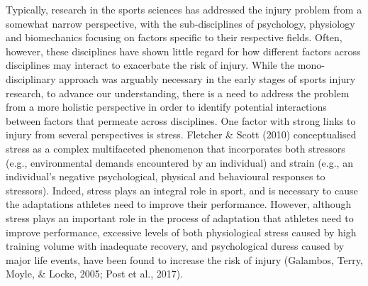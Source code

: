 \documentclass[
  english,
  man,floatsintext]{apa6}
\begin{document}
Typically, research in the sports sciences has addressed the injury problem from a somewhat narrow perspective, with the sub-disciplines of psychology, physiology and biomechanics focusing on factors specific to their respective fields.
Often, however, these disciplines have shown little regard for how different factors across disciplines may interact to exacerbate the risk of injury.
While the mono-disciplinary approach was arguably necessary in the early stages of sports injury research, to advance our understanding, there is a need to address the problem from a more holistic perspective in order to identify potential interactions between factors that permeate across disciplines.
One factor with strong links to injury from several perspectives is stress.
Fletcher \& Scott (2010) conceptualised stress as a complex multifaceted phenomenon that incorporates both stressors (e.g., environmental demands encountered by an individual) and strain (e.g., an individual's negative psychological, physical and behavioural responses to stressors).
Indeed, stress plays an integral role in sport, and is necessary to cause the adaptations athletes need to improve their performance.
However, although stress plays an important role in the process of adaptation that athletes need to improve performance, excessive levels of both physiological stress caused by high training volume with inadequate recovery, and psychological duress caused by major life events, have been found to increase the risk of injury (Galambos, Terry, Moyle, \& Locke, 2005; Post et al., 2017).
\end{document}
